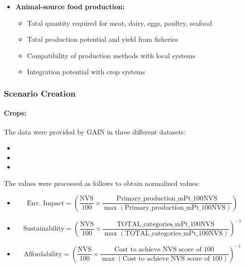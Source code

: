 \begin{enumerate}
\begin{itemize}
\item \textbf{Animal-source food production:}
\begin{itemize}
    \item Total quantity required for meat, dairy, eggs, poultry, seafood
    \item Total production potential and yield from fisheries
    \item Compatibility of production methods with local systems
    \item Integration potential with crop systems
\end{itemize}
\end{itemize}

\end{enumerate}


\subsubsection{Scenario Creation}

\paragraph{Crops:}

The data were provided by GAIN in three different datasets:
\begin{itemize}
    \item {}
    \item {}
    \item {}
\end{itemize}


The values were processed as follows to obtain normalized values:  

\begin{itemize}
    \item 
    \begin{equation}
       \text{Env. Impact}=\left(\frac{\text{NVS}}{100}\times\frac{\text{Primary\_production\_mPt\_100NVS}}{\max(\text{Primary\_production\_mPt\_100NVS})}\right)
    \end{equation}
    \item 
    \begin{equation}
       \text{Sustainability}=\left(\frac{\text{NVS}}{100}\times\frac{\text{TOTAL\_categories\_mPt\_100NVS}}{\max(\text{TOTAL\_categories\_mPt\_100NVS})}\right)^{-1}
    \end{equation}
    \item
    \begin{equation}
       \text{Affordability}=\left(\frac{\text{NVS}}{100}\times\frac{\text{Cost to achieve NVS score of 100}}{\max(\text{Cost to achieve NVS score of 100})}\right)^{-1}
    \end{equation}
\end{itemize}

